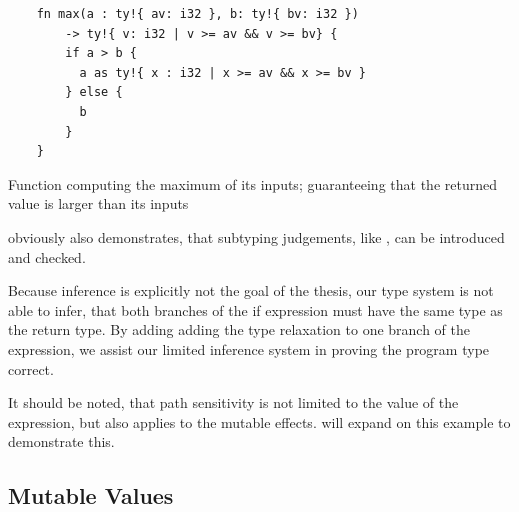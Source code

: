 \documentclass[twoside, english, final]{sdqthesis}
\theoremstyle{definition}
\begin{document}
\begin{listing}[h]
  \begin{verbatim}
    fn max(a : ty!{ av: i32 }, b: ty!{ bv: i32 })
        -> ty!{ v: i32 | v >= av && v >= bv} {
        if a > b {
          a as ty!{ x : i32 | x >= av && x >= bv }
        } else {
          b
        }
    }
  \end{verbatim}
  \caption{Function computing the maximum of its inputs; guaranteeing that the returned value is larger than its inputs}
  \label{lst:max-path-sensitive}
\end{listing}


 obviously also demonstrates, that subtyping judgements, like , can be introduced and checked.

Because inference is explicitly not the goal of the thesis, our type system is not able to infer, that both branches of the if expression must have the same type as the return type. By adding adding the type relaxation to one branch of the expression, we assist our limited inference system in proving the program type correct.

It should be noted, that path sensitivity is not limited to the value of the expression, but also applies to the mutable effects.  will expand on this example to demonstrate this.

\subsection{Mutable Values}
\end{document}
